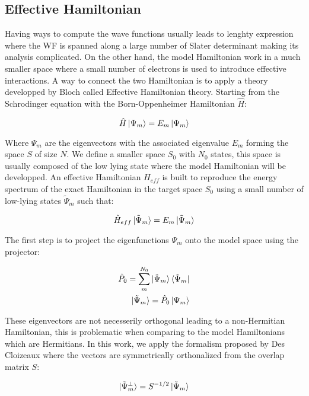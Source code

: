 \documentclass[12pt]{article}
\numberwithin{equation}{section}
\begin{document}
\subsection{Effective Hamiltonian}

Having ways to compute the wave functions usually leads to lenghty expression where the WF is spanned along a large number of Slater determinant making its analysis complicated.
On the other hand, the model Hamiltonian work in a much smaller space where a small number of electrons is used to introduce effective interactions.
A way to connect the two Hamiltonian is to apply a theory developped by Bloch called Effective Hamiltonian theory.
Starting from the Schrodinger equation with the Born-Oppenheimer Hamiltonian $\hat{H}$:

\begin{equation}
    \hat{H}\ket{\Psi_m}=E_m\ket{\Psi_m}
\end{equation}

Where $\Psi_m$ are the eigenvectors with the associated eigenvalue $E_m$ forming the space $S$ of size $N$. 
We define a smaller space $S_0$ with $N_0$ states, this space is usually composed of the low lying state where the model Hamiltonian will be developped.
An effective Hamiltonian $H_{eff}$  is built to reproduce the energy spectrum of the exact Hamiltonian in the target space $S_0$ using a small number of low-lying states $\tilde{\Psi}_m$ such that:

\begin{equation}
    \hat{H}_{eff}\ket{\tilde{\Psi}_m}=E_m \ket{\tilde{\Psi}_m}
\end{equation}

The first step is to project the eigenfunctions $\Psi_m$ onto the model space using the projector:

\begin{align}
    \hat{P}_0=\sum_{m}^{N_0} \ket{\tilde{\Psi}_m} \bra{\tilde{\Psi}_m}\\
    \ket{\tilde{\Psi}_m}=\hat{P}_0 \ket{\Psi_m}
\end{align}

These eigenvectors are not necesserily orthogonal leading to a non-Hermitian Hamiltonian, this is problematic when comparing to the model Hamiltonians which are Hermitians.
In this work, we apply the formalism proposed by Des Cloizeaux where the vectors are symmetrically orthonalized from the overlap matrix $S$:

\begin{equation}
    \ket{\tilde{\Psi}_m^\bot}=S^{-1/2} \ket{\tilde{\Psi}_m}
\end{equation}
\end{document}
